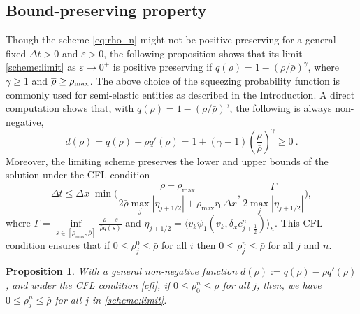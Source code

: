 \documentclass{aims} %
\newtheorem{proposition}[theorem]{Proposition}
\theoremstyle{definition}
\newcommand {\e}  {\varepsilon}
\newcommand {\dt}   {\Delta t}
\begin{document}
\subsection{{Bound-preserving property}}
{ Though the scheme \eqref{eq:rho_n} might not be positive preserving for a general fixed $\dt > 0$ and $\e>0$, 
the following proposition shows that its limit \eqref{scheme:limit} as $\e\to 0^+$ is positive preserving if $q(\rho) = 1 - (\rho / \bar{\rho})^\gamma$, where $\gamma\ge1$ and $\overline{\rho}\ge\rho_{\rm{max}}$.
 The above choice of the squeezing probability function is commonly used  for semi-elastic entities as described in the Introduction. 
 A direct computation shows that, with $q(\rho)= 1 - (\rho / \bar{\rho})^\gamma$, the following is always non-negative, 
\begin{equation*}
    d(\rho)= q(\rho) - \rho q'(\rho) = 1 + (\gamma-1)\left(\frac{\rho}{\overline{\rho}}\right)^{\gamma} \ge 0\ .
\end{equation*}
Moreover, the limiting scheme preserves the lower and upper bounds of the solution under the CFL condition 
\begin{equation}\label{cfl}
\Delta t \leq \Delta x \; \min \big(\frac{\bar{\rho} - \rho_{\max}}{2 \bar{\rho} \max_j |\eta_{j+1/2}| + \rho_{\max} r_0 \Delta x}, \frac{\Gamma}{2 \max_j |\eta_{j+1/2}|} \big),
\end{equation}
\noindent where $\Gamma = \underset{s\in [\rho_{\max}, \bar{\rho}]}{\inf} \frac{\bar{\rho} - s}{\bar{\rho} q(s)}$ { and $\eta_{j+1/2}= \langle v_k \psi_1(v_k, \delta_x c_{j+\frac12}^n)\rangle_h$}. This CFL condition ensures that if $0 \leq \rho_j^0 \leq \bar{\rho}$ for all $i$ then $0 \leq \rho_j^n \leq \bar{\rho}$ for all $j$ and $n$.
}
\begin{proposition} 
 {   With a general non-negative function $d(\rho) :=q(\rho) - \rho q'(\rho)$, and under the CFL condition \eqref{cfl}, if $0 \leq \rho_0^n \leq \bar{\rho}$ for all $j$, then, we have 
    $0 \leq \rho_j^n \leq \bar{\rho}$ for all $j$ in \eqref{scheme:limit}.}
\end{proposition}
\end{document}
